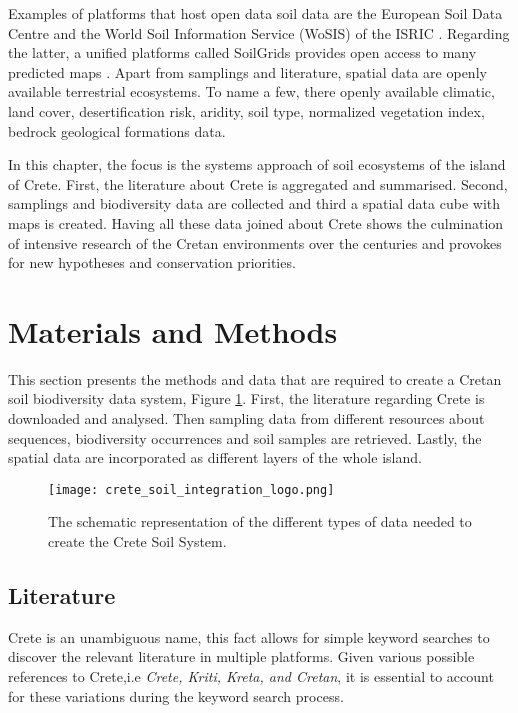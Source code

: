 Examples of platforms that host open data soil data are the 
European Soil Data Centre \parencite{Panagos2022} and the World Soil Information
Service (WoSIS) of the ISRIC \parencite{Batjes2024}. Regarding the latter, a unified
platforms called SoilGrids provides open access to many predicted maps \parencite{poggio-soil-7-217-2021}.
Apart from samplings and literature,
spatial data are openly available terrestrial ecosystems.
To name a few, there openly available climatic, land cover, desertification risk, aridity, soil type, normalized
vegetation index, bedrock geological formations data.

In this chapter, the focus is the systems approach of soil ecosystems of the island of Crete.
First, the literature about Crete is aggregated and summarised. Second, samplings and biodiversity data
are collected and third a spatial data cube with maps is created. 
Having all these data joined about Crete shows the culmination of intensive 
research of the Cretan environments over the centuries and provokes for new
hypotheses and conservation priorities.


\section{Materials and Methods}\label{integration_methods}

This section presents the methods and data that are required to create
a Cretan soil biodiversity data system, Figure \ref{fig:crete_soil_logo}. First, the literature regarding 
Crete is downloaded and analysed. Then sampling data from different 
resources about sequences, biodiversity occurrences and soil samples 
are retrieved. Lastly, the spatial data are incorporated as different 
layers of the whole island.

\begin{figure}[hbt!] 
    \centering\texttt{[image: crete\_soil\_integration\_logo.png]}
    \caption{The schematic representation of the different types of data needed to create the Crete Soil System.}
    \label{fig:crete_soil_logo}
\end{figure}

\subsection{Literature}\label{crete-literature}

Crete is an unambiguous name, this fact allows for simple keyword searches to discover 
the relevant literature in multiple platforms. Given various possible references to Crete,i.e \textit{Crete, Kriti, Kreta, and Cretan},
it is essential to account for these variations during the keyword search process.


